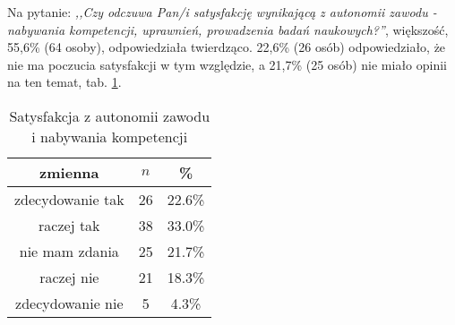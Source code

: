Na pytanie: \textit{,,Czy odczuwa Pan/i satysfakcję wynikającą z autonomii zawodu  - nabywania kompetencji, uprawnień, prowadzenia badań naukowych?''}, większość, 55,6\% (64 osoby), odpowiedziała twierdząco. 22,6\% (26 osób) odpowiedziało, że nie ma poczucia satysfakcji w tym względzie, a 21,7\% (25 osób) nie miało opinii na ten temat, tab. \ref{tab:Q20}.


\begin{table}[H]
\caption{Satysfakcja z autonomii zawodu i nabywania kompetencji}
\centering
\begin{tabular}{ | c | c | c |}
\hline
zmienna & $n$ & \% \\
\hline
zdecydowanie tak  &  26  & 22.6\% \\
\hline
raczej tak  &  38  & 33.0\% \\
\hline
nie mam zdania  &  25  & 21.7\% \\
\hline
raczej nie  &  21  & 18.3\% \\
\hline
zdecydowanie nie  &  5  & 4.3\% \\
\hline
\end{tabular}
\label{tab:Q20}
\end{table}

